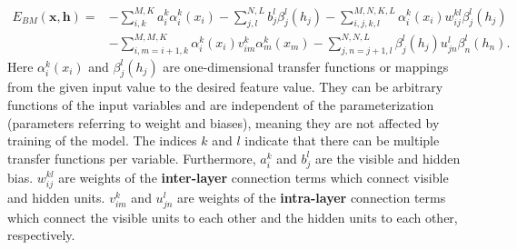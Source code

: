 \documentclass[twoside,english]{uiofysmaster}
\begin{document}
\begin{align}
	E_{BM}(\bm{x}, \bm{h}) =& - \sum_{i, k}^{M, K} a_i^k \alpha_i^k (x_i)
	- \sum_{j, l}^{N, L} b_j^l \beta_j^l (h_j) 
	- \sum_{i,j,k,l}^{M,N,K,L} \alpha_i^k (x_i) w_{ij}^{kl} \beta_j^l (h_j) \nonumber \\
	&- \sum_{i, m=i+1, k}^{M, M, K} \alpha_i^k (x_i) v_{im}^k \alpha_m^k (x_m)
	- \sum_{j,n=j+1,l}^{N,N,L} \beta_j^l (h_j) u_{jn}^l \beta_n^l (h_n).
\end{align}
Here $\alpha_i^k (x_i)$ and $\beta_j^l (h_j)$ are one-dimensional transfer functions or mappings from the given input value to the desired feature value. They can be arbitrary functions of the input variables and are independent of the parameterization (parameters referring to weight and biases), meaning they are not affected by training of the model. The indices $k$ and $l$ indicate that there can be multiple transfer functions per variable.
Furthermore, $a_i^k$ and $b_j^l$ are the visible and hidden bias. $w_{ij}^{kl}$ are weights of the \textbf{inter-layer} connection terms which connect visible and hidden units. $ v_{im}^k$ and $u_{jn}^l$ are weights of the \textbf{intra-layer} connection terms which connect the visible units to each other and the hidden units to each other, respectively.

\begin{comment}
\begin{itemize}
	\item $\alpha_i^k (x_i), \beta_j^l (h_j) $= One dimensional transfer functions, mapping a given input value to a desired feature value. They are sufficient statistics of the model and can be arbitrary non-parametrized functions of the input variable $x_i$ or $h_j$ respectively, but they need to be independent of the parametrization.
	\item $k, l $= These indices denote there can be multiple transfer funcs pr variable.
	\item $a_i^k,  b_j^l$= appear in the first and second term which only depends ont he visible and hidden units respectively. Thus they could be interpreted as the corresponding visible and hidden bias respectively.
	\item $w_{ij}^{kl}$ = inter layer connection term, connects the visible and hidden bias, respectively.
	\item $ v_{im}^k, u_{jn}^l$ = intra layer connection terms, connecting the visible units to each other, and the hidden units to each other, respectively.
\end{itemize}
\end{comment}
\end{document}
